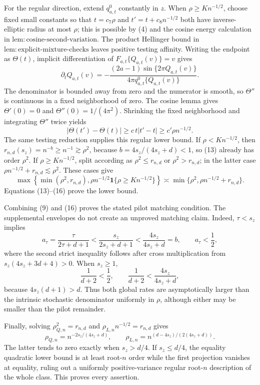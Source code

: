 For the regular direction, extend \(q_{a,t}^{0}\) constantly in \(z\). When \(\rho\ge K n^{-1/2}\), choose fixed small constants so that \(t=c_7\rho\) and \(t'=t+c_8n^{-1/2}\) both have inverse-elliptic radius at most \(\rho\); this is possible by (4) and the cosine energy calculation in \(\mathrm{lem{:}cosine\text{-}second\text{-}variation}\). The product Hellinger bound in \(\mathrm{lem{:}explicit\text{-}mixture\text{-}checks}\) leaves positive testing affinity. Writing the endpoint as \(\Theta(t)\), implicit differentiation of \(F_{a,t}\{Q_{a,t}(v)\}=v\) gives
\[
\partial_tQ_{a,t}(v)
=-\frac{(2a-1)\sin\{2\pi Q_{a,t}(v)\}}
{4\pi q_{a,t}^{0}\{Q_{a,t}(v)\}}.                                \tag{14}
\]
The denominator is bounded away from zero and the numerator is smooth, so \(\Theta''\) is continuous in a fixed neighborhood of zero. The cosine lemma gives \(\Theta'(0)=0\) and \(\Theta''(0)=1/(4\pi^2)\). Shrinking the fixed neighborhood and integrating \(\Theta''\) twice yields
\[
|\Theta(t')-\Theta(t)|\ge c\,t|t'-t|\ge c'\rho n^{-1/2}.          \tag{15}
\]
The same testing reduction supplies this regular lower bound. If \(\rho<K n^{-1/2}\), then \(r_{n,d}(s_z)=n^{-b}\ge n^{-1}\gtrsim\rho^2\), because \(b=4s_z/(4s_z+d)<1\), so (13) already has order \(\rho^2\). If \(\rho\ge K n^{-1/2}\), split according as \(\rho^2\le r_{n,d}\) or \(\rho^2>r_{n,d}\); in the latter case \(\rho n^{-1/2}+r_{n,d}\lesssim\rho^2\). These cases give
\[
\max\!\left\{\min(\rho^2,r_{n,d}),\rho n^{-1/2}\mathbf1\{\rho\ge K n^{-1/2}\}\right\}
\asymp\min\{\rho^2,\rho n^{-1/2}+r_{n,d}\}.                     \tag{16}
\]
Equations (13)--(16) prove the lower bound.

Combining (9) and (16) proves the stated pilot matching condition. The supplemental envelopes do not create an unproved matching claim. Indeed, \(\tau<s_z\) implies
\[
a_\tau=\frac{\tau}{2\tau+d+1}
<\frac{s_z}{2s_z+d+1}
<\frac{4s_z}{4s_z+d}=b,
\qquad a_\tau<\frac12,                                             \tag{17}
\]
where the second strict inequality follows after cross multiplication from \(s_z(4s_z+3d+4)>0\). When \(s_z\ge1\),
\[
\frac1{d+2}<\frac12,
\qquad
\frac1{d+2}<\frac{4s_z}{4s_z+d},                                  \tag{18}
\]
because \(4s_z(d+1)>d\). Thus both global rates are asymptotically larger than the intrinsic stochastic denominator uniformly in \(\rho\), although either may be smaller than the pilot remainder.

Finally, solving \(\rho_{Q,n}^2=r_{n,d}\) and \(\rho_{L,n}n^{-1/2}=r_{n,d}\) gives
\[
\rho_{Q,n}=n^{-2s_z/(4s_z+d)},
\qquad
\rho_{L,n}=n^{(d-4s_z)/(2(4s_z+d))}.                               \tag{19}
\]
The latter tends to zero exactly when \(s_z>d/4\). If \(s_z\le d/4\), the equality quadratic lower bound is at least root-\(n\) order while the first projection vanishes at equality, ruling out a uniformly positive-variance regular root-\(n\) description of the whole class. This proves every assertion.